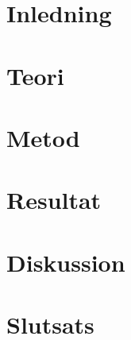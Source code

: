 \documentclass[12pt,a4paper]{article}
\begin{document}



\newpage

\tableofcontents
\newpage

\section{Inledning}


\section{Teori} \label{sec:teori}


\section{Metod}


\section{Resultat}


\section{Diskussion}


\section{Slutsats}


\renewcommand*{\UrlFont}{\rmfamily}
\printbibliography[heading=bibintoc]

\newpage
\appendix
\renewcommand{\thetable}{\Alph{section}.\arabic{table}}

\end{document}
